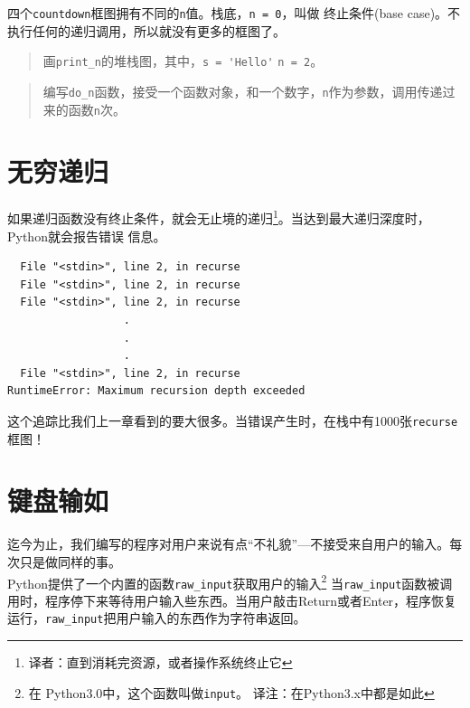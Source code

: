 {{四个{\tt countdown}框图拥有不同的{\tt n}值。栈底，{\tt n = 0}，叫做
终止条件(base case)。不执行任何的递归调用，所以就没有更多的框图了。

\begin{quote}
画\verb"print_n"的堆栈图，其中，\verb"s = 'Hello'" {\tt n = 2}。
\end{quote}

\begin{quote}
编写\verb"do_n"函数，接受一个函数对象，和一个数字，{\tt n}作为参数，调用传递过来的函数{\tt n}次。
\end{quote}

\section{无穷递归}

如果递归函数没有终止条件，就会无止境的递归\footnote{译者：直到消耗完资源，或者操作系统终止它}。当达到最大递归深度时，Python就会报告错误
信息。


\beforeverb
\begin{verbatim}
  File "<stdin>", line 2, in recurse
  File "<stdin>", line 2, in recurse
  File "<stdin>", line 2, in recurse
                  .   
                  .
                  .
  File "<stdin>", line 2, in recurse
RuntimeError: Maximum recursion depth exceeded
\end{verbatim}
\afterverb

这个追踪比我们上一章看到的要大很多。当错误产生时，在栈中有1000张{\tt recurse}框图！

\section{键盘输如}

迄今为止，我们编写的程序对用户来说有点“不礼貌”---不接受来自用户的输入。每次只是做同样的事。\\

Python提供了一个内置的函数\verb"raw_input"获取用户的输入\footnote{在
Python3.0中，这个函数叫做{\tt input}。  译注：在Python3.x中都是如此}
当\verb"raw_input"函数被调用时，程序停下来等待用户输入些东西。当用户敲击{\sf Return}或者{\sf Enter}，程序恢复运行，\verb"raw_input"把用户输入的东西作为字符串返回。

}}
